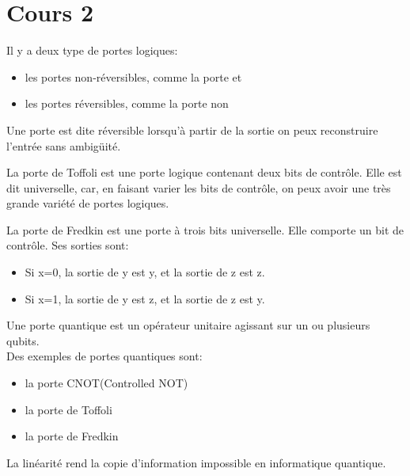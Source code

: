 \section{Cours 2}
Il y a deux type de portes logiques:
\begin{itemize}
	\item les portes non-réversibles, comme la porte et
	\item les portes réversibles, comme la porte non
\end{itemize}

Une porte est dite réversible lorsqu'à partir de la sortie on peux reconstruire l'entrée sans ambigüité.

La porte de Toffoli est une porte logique contenant deux bits de contrôle. Elle est dit universelle, car, en faisant
varier les bits de contrôle, on peux avoir une très grande variété de portes logiques.

La porte de Fredkin est une porte à trois bits universelle. Elle comporte un bit de contrôle. Ses sorties sont:
\begin{itemize}
	\item Si x=0, la sortie de y est y, et la sortie de z est z.
	\item Si x=1, la sortie de y est z, et la sortie de z est y.
\end{itemize}

Une porte quantique est un opérateur unitaire agissant sur un ou plusieurs qubits.\\
Des exemples de portes quantiques sont:
\begin{itemize}
	\item la porte CNOT(Controlled NOT)
	\item la porte de Toffoli
	\item la porte de Fredkin
\end{itemize}

La linéarité rend la copie d'information impossible en informatique quantique.
